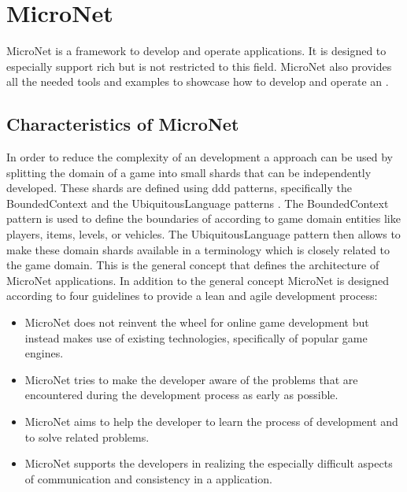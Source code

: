 \section{MicroNet}

MicroNet is a framework to develop and operate \ms{} applications. It is
designed to especially support rich \ogs{} but is not restricted to this
field. MicroNet also provides all the needed tools and examples to showcase how
to develop and operate an \og{}.

\subsection{Characteristics of MicroNet}

In order to reduce the complexity of an \og{} development a \ms{} approach can
be used by splitting the domain of a game into small shards that can be
independently developed. These shards are defined using  \gls{ddd}
patterns, specifically the BoundedContext and the UbiquitousLanguage patterns
\cite{fowler2003-2016ddd}. The BoundedContext pattern is used to define the
boundaries of \mss{} according to game domain entities like players, items,
levels, or vehicles. The UbiquitousLanguage pattern then allows to make these
domain shards available in a terminology which is closely related to the game
domain. This is the general concept that defines the architecture of MicroNet
applications. In addition to the general concept MicroNet is designed according
to four guidelines to provide a lean and agile \og{} development process:
\begin{itemize}
  \item MicroNet does not reinvent the wheel for online game development but
  instead makes use of existing technologies, specifically of popular game
  engines.
  \item MicroNet tries to make the developer aware of the problems that are
  encountered during the development process as early as possible.
  \item MicroNet aims to help the developer to learn the process of \og{}
  development and to solve related problems.
  \item MicroNet supports the developers in realizing the especially
  difficult aspects of communication and consistency in a \ms{} application.
\end{itemize}








 

